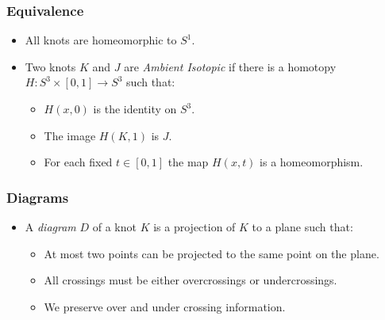 \documentclass{beamer}
\begin{document}
\begin{frame}
  \frametitle{Equivalence}
  \begin{itemize}
  \item All knots are homeomorphic to $S^1$.
    \pause
  \item Two knots $K$ and $J$ are \textit{Ambient Isotopic}
    if there is a homotopy $H:S^3\times[0,1]\rightarrow S^3$ such that:
    \begin{itemize}
      \pause
    \item $H(x,0)$ is the identity on $S^3$.
      \pause
    \item The image $H(K,1)$ is $J$.
      \pause
    \item For each fixed $t\in[0,1]$ the map $H(x,t)$ is a
      homeomorphism.
    \end{itemize}
  \end{itemize}
\end{frame}

\begin{frame}
  \frametitle{Diagrams}
  \begin{itemize}
  \item A \textit{diagram} $D$ of a knot $K$ is a projection of
    $K$ to a plane such that:
    \begin{itemize}
      \pause
    \item At most two points can be projected to the same point on the plane.
      \pause
    \item All crossings must be either overcrossings or undercrossings.
      \pause
    \item We preserve over and under crossing information.
    \end{itemize}
    \begin{center}
    \end{center}
  \end{itemize}
\end{frame}
\end{document}
